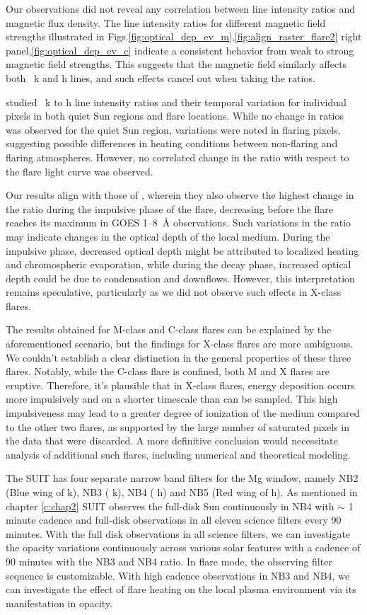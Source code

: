 Our observations did not reveal any correlation between line intensity ratios and magnetic flux density. The line intensity ratios for different magnetic field strengths illustrated in Figs.\ref{fig:optical_dep_ev_m},\ref{fig:align_raster_flare2} right panel,\ref{fig:optical_dep_ev_c} indicate a consistent behavior from weak to strong magnetic field strengths. This suggests that the magnetic field similarly affects both  ~k and h lines, and such effects cancel out when taking the ratios.

\cite{kerr15} studied  ~k to h line intensity ratios and their temporal variation for individual pixels in both quiet Sun regions and flare locations. While no change in ratios was observed for the quiet Sun region, variations were noted in flaring pixels, suggesting possible differences in heating conditions between non-flaring and flaring atmospheres. However, no correlated change in the ratio with respect to the flare light curve was observed.

Our results align with those of \cite{kerr15}, wherein they also observe the highest change in the ratio during the impulsive phase of the flare, decreasing before the flare reaches its maximum in GOES 1{--}8~{\AA} observations. Such variations in the ratio may indicate changes in the optical depth of the local medium. During the impulsive phase, decreased optical depth might be attributed to localized heating and chromospheric evaporation, while during the decay phase, increased optical depth could be due to condensation and downflows. However, this interpretation remains speculative, particularly as we did not observe such effects in X-class flares.

The results obtained for M-class and C-class flares can be explained by the aforementioned scenario, but the findings for X-class flares are more ambiguous. We couldn't establish a clear distinction in the general properties of these three flares. Notably, while the C-class flare is confined, both M and X flares are eruptive. Therefore, it's plausible that in X-class flares, energy deposition occurs more impulsively and on a shorter timescale than can be sampled. This high impulsiveness may lead to a greater degree of ionization of the medium compared to the other two flares, as supported by the large number of saturated pixels in the data that were discarded. A more definitive conclusion would necessitate analysis of additional such flares, including numerical and theoretical modeling.

The SUIT has four separate narrow band filters for the Mg window, namely NB2 (Blue wing of   k), NB3 (  k), NB4 (  h) and NB5 (Red wing of   h). As mentioned in chapter \ref{c:chap2} SUIT observes the full-disk Sun continuously in NB4 with $\sim$ 1 minute cadence and full-disk observations in all eleven science filters every 90 minutes. With the full disk observations in all science filters, we can investigate the opacity variations continuously across various solar features with a cadence of 90 minutes with the NB3 and NB4 ratio. In flare mode, the observing filter sequence is customizable. With high cadence observations in NB3 and NB4, we can investigate the effect of flare heating on the local plasma environment via its manifestation in opacity.
